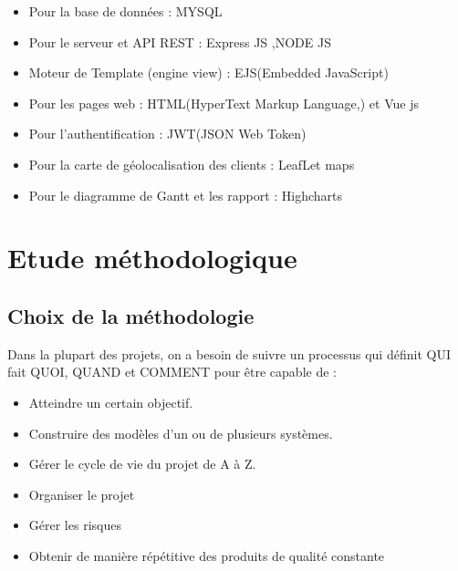 \begin{itemize}

\item{Pour la base de donn\'{e}es : MYSQL}
\item{Pour le serveur et API REST : Express JS ,NODE JS}
\item{Moteur de Template (engine view) : EJS(Embedded JavaScript) }
\item{Pour les pages web : HTML(HyperText Markup Language,) et Vue js}
\item{Pour l'authentification : JWT(JSON Web Token) }
\item{Pour la carte de g\'{e}olocalisation des clients : LeafLet maps}
\item{Pour le diagramme de Gantt et les rapport : Highcharts}

\end{itemize}

\section{ Etude m\'{e}thodologique }



  \subsection{Choix de la   m\'{e}thodologie}

  Dans la plupart des projets, on a besoin de suivre un processus qui d\'{e}finit
QUI fait QUOI, QUAND et COMMENT pour \^{e}tre capable de :

\begin{itemize}
\item{Atteindre un certain objectif.}
\item{Construire des mod\`{e}les d'un ou de plusieurs syst\`{e}mes.}
\item{G\'{e}rer le cycle de vie du projet de A \`{a} Z.}
\item{Organiser le projet}
\item{G\'{e}rer les risques}
\item{Obtenir de mani\`{e}re r\'{e}p\'{e}titive des produits de qualit\'{e} constante}
\end{itemize}

